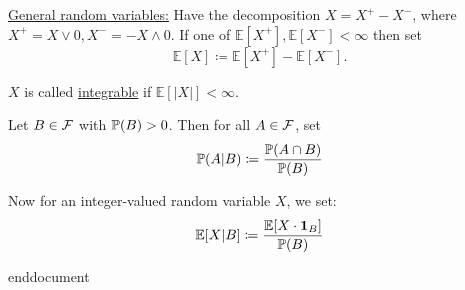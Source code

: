 \documentclass{article}
\begin{document}
\underline{General random variables:} Have the decomposition $ X = X^{+}-X^{-} $, where $ X^{+} = X\lor 0, X^{-}=-X\land 0 $. If one of $ \mathbb{E}[X^{+}], \mathbb{E}[X^{-}]  <\infty $ then set 
\[
	\mathbb{E}[X]\coloneqq \mathbb{E}[X^{+}]-\mathbb{E}[X^{-}].  
\]

\begin{boxdef}\label{def: integrable rv}
	$ X $ is called \underline{integrable} if $ \mathbb{E}[|X|]<\infty $.
\end{boxdef}

\begin{boxdef}\label{def: cond prob event}
Let $ B\in \mathcal{F} $ with $ \mathbb{P}(B)>0 $. Then for all $ A\in \mathcal{F} $, set 
\[
\mathbb{P}(A|B)\coloneqq \frac{\mathbb{P}(A\cap B)}{\mathbb{P}(B)}
\]

Now for an integer-valued random variable $ X $, we set:
\[
	\mathbb{E}[X|B]\coloneqq \frac{\mathbb{E}[X\cdot \mathbf{1}_{B}]}{\mathbb{P}(B)}
\]

\end{boxdef}

end{document}
\end{document}

